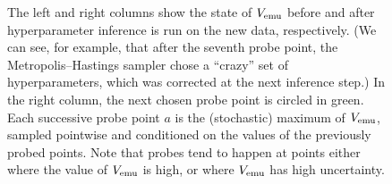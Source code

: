 \begin{figure}
{      The left and right columns show the state of $V_{\textrm{emu}}$ before and after hyperparameter inference is run on the new data, respectively.
      (We can see, for example, that after the seventh probe point, the Metropolis--Hastings sampler chose a ``crazy'' set of hyperparameters, which was corrected at the next inference step.)
      In the right column, the next chosen probe point is circled in green.
      Each successive probe point $a$ is the (stochastic) maximum of $V_{\textrm{emu}}$, sampled pointwise and conditioned on the values of the previously probed points.
      Note that probes tend to happen at points either where the value of $V_{\textrm{emu}}$ is high, or where $V_{\textrm{emu}}$ has high uncertainty.
      }
    \label{fig:bayesopt-sequence}
\end{figure}




\FloatBarrier
